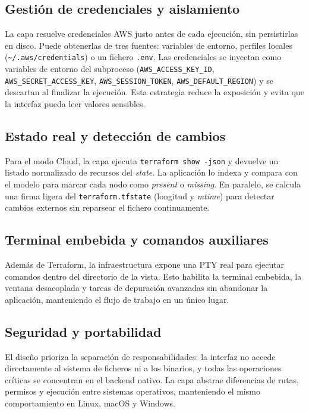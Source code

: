 \documentclass{article}
\begin{document}
{        \subsection{Gestión de credenciales y aislamiento}
        \justify
        La capa resuelve credenciales AWS justo antes de cada ejecución, sin
        persistirlas en disco. Puede obtenerlas de tres fuentes: variables de entorno,
        perfiles locales (\texttt{\textasciitilde/.aws/credentials}) o un fichero \texttt{.env}.
        Las credenciales se inyectan como variables de entorno del subproceso
        (\texttt{AWS\_ACCESS\_KEY\_ID}, \texttt{AWS\_SECRET\_ACCESS\_KEY},
        \texttt{AWS\_SESSION\_TOKEN}, \texttt{AWS\_DEFAULT\_REGION}) y se descartan al
        finalizar la ejecución. Esta estrategia reduce la exposición y evita que la
        interfaz pueda leer valores sensibles.

        \subsection{Estado real y detección de cambios}
        \justify
        Para el modo Cloud, la capa ejecuta \texttt{terraform show -json} y devuelve
        un listado normalizado de recursos del \textit{state}. La aplicación lo indexa
        y compara con el modelo para marcar cada nodo como \textit{present} o
        \textit{missing}. En paralelo, se calcula una firma ligera del
        \texttt{terraform.tfstate} (longitud y \textit{mtime}) para detectar cambios
        externos sin reparsear el fichero continuamente.

        \subsection{Terminal embebida y comandos auxiliares}
        \justify
        Además de Terraform, la infraestructura expone una PTY real para ejecutar
        comandos dentro del directorio de la vista. Esto habilita la terminal
        embebida, la ventana desacoplada y tareas de depuración avanzadas sin
        abandonar la aplicación, manteniendo el flujo de trabajo en un único lugar.

        \subsection{Seguridad y portabilidad}
        \justify
        El diseño prioriza la separación de responsabilidades: la interfaz no accede
        directamente al sistema de ficheros ni a los binarios, y todas las operaciones
        críticas se concentran en el backend nativo. La capa abstrae diferencias de
        rutas, permisos y ejecución entre sistemas operativos, manteniendo el mismo
        comportamiento en Linux, macOS y Windows.
    }
\end{document}
